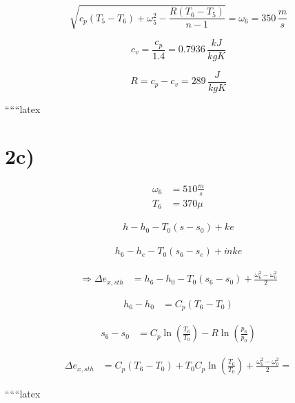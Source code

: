 \[
\sqrt{c_p (T_5 - T_6) + \omega_5^2 - \frac{R(T_6 - T_5)}{n - 1}} = \omega_6 = 350 \, \frac{m}{s}
\]

\[
c_v = \frac{c_p}{1.4} = 0.7936 \, \frac{kJ}{kgK}
\]

\[
R = c_p - c_v = 289 \, \frac{J}{kgK}
\]

``````latex

\section*{2c)}

\begin{align*}
    \omega_6 &= 510 \frac{m}{s} \\
    T_6 &= 370 \mu
\end{align*}

\begin{align*}
    h - h_0 - T_0 (s - s_0) + ke
\end{align*}

\begin{align*}
    h_6 - h_e - T_0 (s_6 - s_e) + \dot{m} ke
\end{align*}

\begin{align*}
    \Rightarrow \Delta e_{x,sth} &= h_6 - h_0 - T_0 (s_6 - s_0) + \frac{\omega_6^2 - \omega_0^2}{2}
\end{align*}

\begin{align*}
    h_6 - h_0 &= C_p (T_6 - T_0)
\end{align*}

\begin{align*}
    s_6 - s_0 &= C_p \ln \left( \frac{T_6}{T_0} \right) - R \ln \left( \frac{p_6}{p_0} \right)
\end{align*}

\begin{align*}
    \Delta e_{x,sth} &= C_p (T_6 - T_0) + T_0 C_p \ln \left( \frac{T_6}{T_0} \right) + \frac{\omega_6^2 - \omega_0^2}{2} = 
\end{align*}

``````latex


